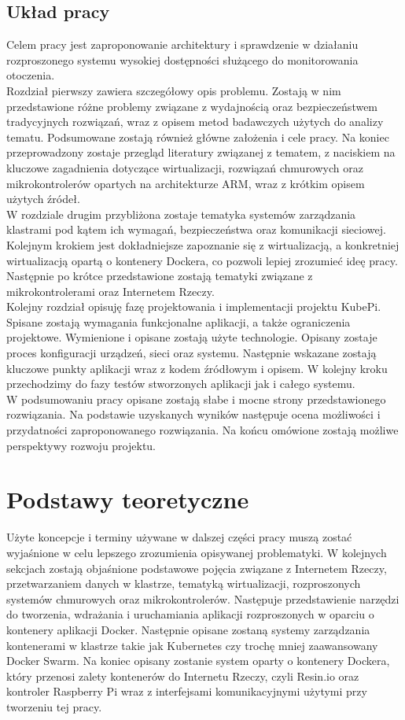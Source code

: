 \documentclass[12pt]{report}
\let\Oldsection\section
\renewcommand{\section}{\FloatBarrier\Oldsection}
\begin{document}
\section{Układ pracy}
Celem pracy jest zaproponowanie architektury i sprawdzenie w działaniu rozproszonego systemu wysokiej dostępności służącego do monitorowania otoczenia. \\
\indent Rozdział pierwszy zawiera szczegółowy opis problemu. Zostają w nim przedstawione różne problemy związane z wydajnością oraz bezpieczeństwem tradycyjnych rozwiązań, wraz z opisem metod badawczych użytych do analizy tematu. Podsumowane zostają również główne założenia i cele pracy. Na koniec przeprowadzony zostaje przegląd literatury związanej z tematem, z naciskiem na kluczowe zagadnienia dotyczące wirtualizacji, rozwiązań chmurowych oraz mikrokontrolerów opartych na architekturze ARM, wraz z krótkim opisem użytych źródeł. \\
\indent W rozdziale drugim przybliżona zostaje tematyka systemów zarządzania klastrami pod kątem ich wymagań, bezpieczeństwa oraz komunikacji sieciowej. Kolejnym krokiem jest dokładniejsze zapoznanie się z wirtualizacją, a konkretniej wirtualizacją opartą o kontenery Dockera, co pozwoli lepiej zrozumieć ideę pracy. Następnie po krótce przedstawione zostają tematyki związane z mikrokontrolerami oraz Internetem Rzeczy. \\
\indent Kolejny rozdział opisuję fazę projektowania i implementacji projektu KubePi. Spisane zostają wymagania funkcjonalne aplikacji, a także ograniczenia projektowe. Wymienione i opisane zostają użyte technologie. Opisany zostaje proces konfiguracji urządzeń, sieci oraz systemu. Następnie wskazane zostają kluczowe punkty aplikacji wraz z kodem źródłowym i opisem. W kolejny kroku przechodzimy do fazy testów stworzonych aplikacji jak i całego systemu. \\
\indent W podsumowaniu pracy opisane zostają słabe i mocne strony przedstawionego rozwiązania. Na podstawie uzyskanych wyników następuje ocena możliwości i przydatności zaproponowanego rozwiązania. Na końcu omówione zostają możliwe perspektywy rozwoju projektu.

\chapter{Podstawy teoretyczne}\label{chap:background}
Użyte koncepcje i terminy używane w dalszej części pracy muszą zostać wyjaśnione w celu lepszego zrozumienia opisywanej problematyki. W kolejnych sekcjach zostają objaśnione podstawowe pojęcia związane z Internetem Rzeczy, przetwarzaniem danych w klastrze, tematyką wirtualizacji, rozproszonych systemów chmurowych oraz mikrokontrolerów. Następuje przedstawienie narzędzi do tworzenia, wdrażania i uruchamiania aplikacji rozproszonych w oparciu o kontenery aplikacji Docker. Następnie opisane zostaną systemy zarządzania kontenerami w klastrze takie jak Kubernetes czy trochę mniej zaawansowany Docker Swarm. Na koniec opisany zostanie system oparty o kontenery Dockera, który przenosi zalety kontenerów do Internetu Rzeczy, czyli Resin.io oraz kontroler Raspberry Pi wraz z interfejsami komunikacyjnymi użytymi przy tworzeniu tej pracy.
\end{document}
